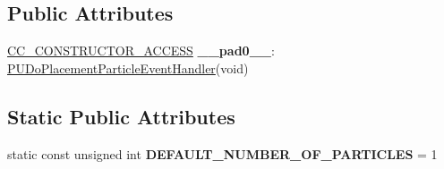 \subsection*{Public Attributes}
\begin{DoxyCompactItemize}
\item 
\mbox{\label{classPUDoPlacementParticleEventHandler_a8ca6f3a2f9e88de60efd4f8412c6c8df}} 
\hyperlink{_2cocos2d_2cocos_2base_2ccConfig_8h_a25ef1314f97c35a2ed3d029b0ead6da0}{C\+C\+\_\+\+C\+O\+N\+S\+T\+R\+U\+C\+T\+O\+R\+\_\+\+A\+C\+C\+E\+SS} {\bfseries \+\_\+\+\_\+pad0\+\_\+\+\_\+}\+: \hyperlink{classPUDoPlacementParticleEventHandler}{P\+U\+Do\+Placement\+Particle\+Event\+Handler}(void)
\end{DoxyCompactItemize}
\subsection*{Static Public Attributes}
\begin{DoxyCompactItemize}
\item 
\mbox{\label{classPUDoPlacementParticleEventHandler_a7cf8132748f2fee225b86e030cf81066}} 
static const unsigned int {\bfseries D\+E\+F\+A\+U\+L\+T\+\_\+\+N\+U\+M\+B\+E\+R\+\_\+\+O\+F\+\_\+\+P\+A\+R\+T\+I\+C\+L\+ES} = 1
\end{DoxyCompactItemize}
